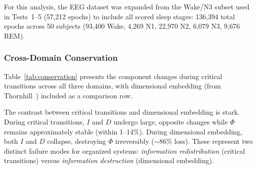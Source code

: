 \documentclass[12pt,a4paper]{article}
\begin{document}
For this analysis, the EEG dataset was expanded from the Wake/N3 subset used in Tests~1--5 (57,212 epochs) to include all scored sleep stages: 136,394 total epochs across 50 subjects (93,400 Wake, 4,269 N1, 22,970 N2, 6,079 N3, 9,676 REM).

\subsubsection{Cross-Domain Conservation}

Table~\ref{tab:conservation} presents the component changes during critical transitions across all three domains, with dimensional embedding (from Thornhill~\cite{thornhill2026b,thornhill2026c}) included as a comparison row.

\begin{table}
\caption{Component redistribution during critical transitions and dimensional embedding. $\Delta I$ and $\Delta D$ are percentage changes in integration and differentiation; $\Delta\Phi$ is the percentage change in total organizational information $\Phi = I + D$. The 86\% law row shows the effect of dimensional embedding (Thornhill~\cite{thornhill2026b,thornhill2026c}) for comparison. All $p$-values from Mann--Whitney $U$ tests.\label{tab:conservation}}
\end{table}

The contrast between critical transitions and dimensional embedding is stark. During critical transitions, $I$ and $D$ undergo large, opposite changes while $\Phi$ remains approximately stable (within 1--14\%). During dimensional embedding, both $I$ and $D$ collapse, destroying $\Phi$ irreversibly (${\sim}86$\% loss). These represent two distinct failure modes for organized systems: \emph{information redistribution} (critical transitions) versus \emph{information destruction} (dimensional embedding).
\end{document}
